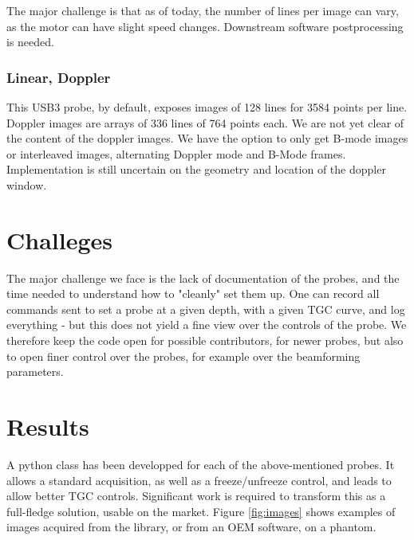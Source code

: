\documentclass{article}
\begin{document}
The major challenge is that as of today, the number of lines per image can vary, as the motor can have slight speed changes. Downstream software postprocessing is needed.

\subsubsection{Linear, Doppler}

This USB3 probe, by default, exposes images of 128 lines for 3584 points per line. Doppler images are arrays of 336 lines of 764 points each. We are not yet clear of the content of the doppler images. We have the option to only get B-mode images or interleaved images, alternating Doppler mode and B-Mode frames. Implementation is still uncertain on the geometry and location of the doppler window.

\section{Challeges}

The major challenge we face is the lack of documentation of the probes, and the time needed to understand how to "cleanly" set them up. One can record all commands sent to set a probe at a given depth, with a given TGC curve, and log everything - but this does not yield a fine view over the controls of the probe. We therefore keep the code open for possible contributors, for newer probes, but also to open finer control over the probes, for example over the beamforming parameters.


\section{Results}

A python class has been developped for each of the above-mentioned probes. It allows a standard acquisition, as well as a freeze/unfreeze control, and leads to allow better TGC controls. Significant work is required to transform this as a full-fledge solution, usable on the market. Figure \ref{fig:images} shows examples of images acquired from the library, or from an OEM software, on a phantom.
\end{document}
